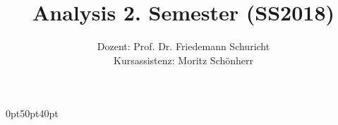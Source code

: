 \titleformat{\part}[display]
{\normalfont\huge\bfseries}{\centering\partname\ \thepart}{20pt}{\Huge\centering}
\titlespacing*{\part}{0pt}{50pt}{40pt}
\titleformat{\chapter}[display]
{\normalfont\huge\bfseries}{\chaptertitlename\ \thechapter}{20pt}{\LARGE}
\titlespacing*{\chapter} {0pt}{50pt}{40pt}
\setlength\parindent{0pt} %
\renewcommand*{\arraystretch}{1.4}


\title{\textbf{Analysis 2. Semester (SS2018)}}
\author{Dozent: Prof. Dr. Friedemann Schuricht\\
	Kursassistenz: Moritz Schönherr}




\frontmatter
\maketitle
\tableofcontents

\mainmetter




\backmatter

